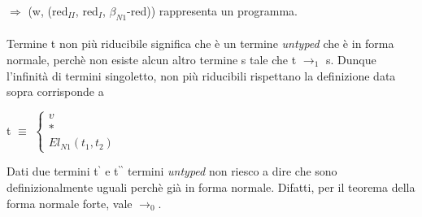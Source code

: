 \begin{prooftree}
\end{prooftree}
\noindent
 $\Rightarrow$ (w, (red$_{II}$, red$_I$, $\beta_{N1}$-red)) rappresenta un programma.\\\\
\noindent
Termine t non pi\`u riducibile significa che \`e un termine \textit{untyped} che \`e in forma normale, perch\`e non esiste alcun altro termine s tale che t $\rightarrow_1$ s. Dunque l'infinit\`a di termini singoletto, non pi\`u riducibili rispettano la definizione data sopra corrisponde a\\
\begin{center}
t $\equiv$
$
\begin{cases}
v \\
\ast \\
El_{N1}(t_1, t_2)
\end{cases}
$
\end{center}
\noindent Dati due termini t$^\backprime$ e t$^{\backprime\backprime}$ termini \textit{untyped} non riesco a dire che sono definizionalmente uguali perch\`e gi\`a in forma normale. Difatti,  per il teorema della forma normale forte, vale $\rightarrow_0$.






















